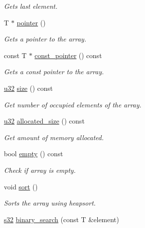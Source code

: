 \begin{DoxyCompactItemize}
\begin{DoxyCompactList}\small\item\em Gets last element. \end{DoxyCompactList}\item 
T $\ast$ \hyperlink{classirr_1_1core_1_1array_a7b29797486e1c2ab3e7821082dab998c}{pointer} ()
\begin{DoxyCompactList}\small\item\em Gets a pointer to the array. \end{DoxyCompactList}\item 
const T $\ast$ \hyperlink{classirr_1_1core_1_1array_a8bf5bc844936a56632038524942f89f1}{const\+\_\+pointer} () const 
\begin{DoxyCompactList}\small\item\em Gets a const pointer to the array. \end{DoxyCompactList}\item 
\hyperlink{namespaceirr_a0416a53257075833e7002efd0a18e804}{u32} \hyperlink{classirr_1_1core_1_1array_abc592bab637d54799b6c86d6d0e8adf8}{size} () const 
\begin{DoxyCompactList}\small\item\em Get number of occupied elements of the array. \end{DoxyCompactList}\item 
\hyperlink{namespaceirr_a0416a53257075833e7002efd0a18e804}{u32} \hyperlink{classirr_1_1core_1_1array_a2a15ea5df83792bce4366969d5b164c4}{allocated\+\_\+size} () const 
\begin{DoxyCompactList}\small\item\em Get amount of memory allocated. \end{DoxyCompactList}\item 
bool \hyperlink{classirr_1_1core_1_1array_a1de2f5999968e104bf0ec6f057f097c2}{empty} () const 
\begin{DoxyCompactList}\small\item\em Check if array is empty. \end{DoxyCompactList}\item 
void \hyperlink{classirr_1_1core_1_1array_a870e52dd57dd67a9d59e5ca5f82bca94}{sort} ()
\begin{DoxyCompactList}\small\item\em Sorts the array using heapsort. \end{DoxyCompactList}\item 
\hyperlink{namespaceirr_ac66849b7a6ed16e30ebede579f9b47c6}{s32} \hyperlink{classirr_1_1core_1_1array_a35412f669b983eaaf3792b82966db24a}{binary\+\_\+search} (const T \&element)

\end{DoxyCompactItemize}
